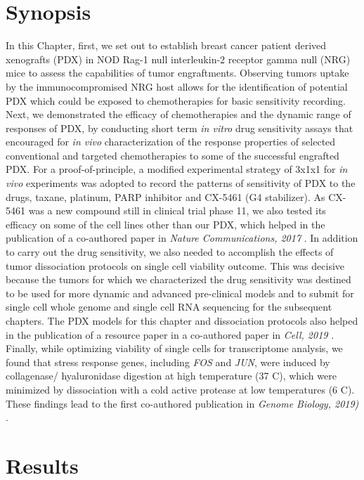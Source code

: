 \section{Synopsis}
 In this Chapter, first, we set out to establish  breast cancer patient derived xenografts (PDX) in NOD Rag-1 null interleukin-2 receptor gamma null (NRG) mice to assess the capabilities of tumor  engraftments. Observing tumors uptake by the immunocompromised NRG host allows 
 for the identification of potential PDX which could be exposed to chemotherapies for basic sensitivity recording. Next, we demonstrated the efficacy of chemotherapies and the dynamic range of responses of PDX, by conducting short term \textit{in vitro} drug sensitivity assays that encouraged for \textit{in vivo} characterization of the response properties of selected conventional and targeted chemotherapies to some of the successful engrafted  PDX.  For a proof-of-principle, a modified experimental strategy of 3x1x1 for \textit{ in vivo} experiments was adopted to record the patterns of sensitivity of PDX to the drugs, taxane, platinum, PARP inhibitor and CX-5461 (G4 stabilizer). As CX-5461 was a new compound still in clinical trial phase 11, we also tested its efficacy on some of the cell lines other than our PDX, which helped in the publication of a co-authored paper in \textit{Nature Communications, 2017} \cite{xu2017cx}. In addition to carry out the drug sensitivity, we also needed to accomplish the effects of  tumor dissociation protocols on single cell viability outcome. This was decisive because the tumors for which we characterized the drug sensitivity was destined to be used for more dynamic and advanced pre-clinical models and to submit for single cell whole genome and single cell RNA sequencing for the subsequent chapters. The PDX models for this chapter and dissociation protocols also helped in the publication of a resource paper in a co-authored paper in \textit {Cell, 2019} \cite{laks2019clonal}. Finally, while optimizing viability of single cells for transcriptome analysis, we found that stress response genes, including \textit{FOS} and \textit{JUN}, were induced by collagenase/ hyaluronidase digestion at high temperature (37 \textdegree C), which were minimized by dissociation with a cold active protease at low temperatures (6 \textdegree C). These findings lead to the first co-authored publication in \textit {Genome Biology, 2019)} \cite{o2019dissociation}.
 
\section{Results}

